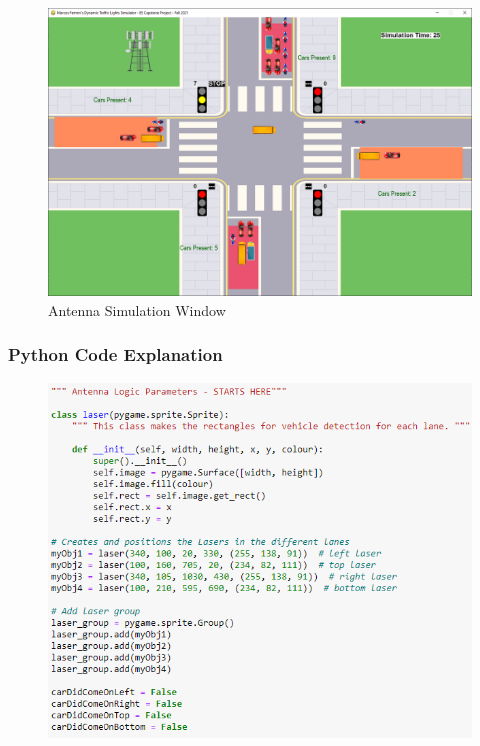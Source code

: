 \documentclass[12pt, a4paper,titlepage]{article}
\begin{document}
\begin{figure}[H]
	\centering
	\includegraphics[width=\linewidth]{images/Antenna}
	\caption{Antenna Simulation Window}
	\label{fig:antenna}
\end{figure}

\subsubsection{Python Code Explanation}

\begin{figure}[H]
	\centering
	\includegraphics[width=\linewidth]{images/a1}
	\caption{}
	\label{fig:a1}
\end{figure}
\end{document}
